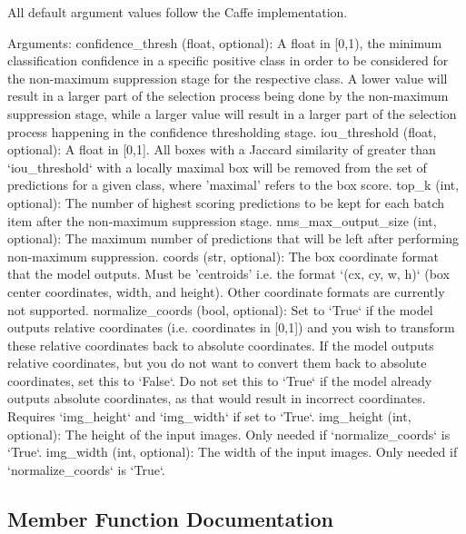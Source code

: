 \begin{DoxyVerb}All default argument values follow the Caffe implementation.

Arguments:
    confidence_thresh (float, optional): A float in [0,1), the minimum classification confidence in a specific
positive class in order to be considered for the non-maximum suppression stage for the respective class.
A lower value will result in a larger part of the selection process being done by the non-maximum suppression
stage, while a larger value will result in a larger part of the selection process happening in the confidence
thresholding stage.
    iou_threshold (float, optional): A float in [0,1]. All boxes with a Jaccard similarity of greater than `iou_threshold`
with a locally maximal box will be removed from the set of predictions for a given class, where 'maximal' refers
to the box score.
    top_k (int, optional): The number of highest scoring predictions to be kept for each batch item after the
non-maximum suppression stage.
    nms_max_output_size (int, optional): The maximum number of predictions that will be left after performing non-maximum
suppression.
    coords (str, optional): The box coordinate format that the model outputs. Must be 'centroids'
i.e. the format `(cx, cy, w, h)` (box center coordinates, width, and height). Other coordinate formats are
currently not supported.
    normalize_coords (bool, optional): Set to `True` if the model outputs relative coordinates (i.e. coordinates in [0,1])
and you wish to transform these relative coordinates back to absolute coordinates. If the model outputs
relative coordinates, but you do not want to convert them back to absolute coordinates, set this to `False`.
Do not set this to `True` if the model already outputs absolute coordinates, as that would result in incorrect
coordinates. Requires `img_height` and `img_width` if set to `True`.
    img_height (int, optional): The height of the input images. Only needed if `normalize_coords` is `True`.
    img_width (int, optional): The width of the input images. Only needed if `normalize_coords` is `True`.
\end{DoxyVerb}
 

\subsection{Member Function Documentation}
\mbox{\label{classkeras__utils_1_1keras__layer___decode_detections_1_1_decode_detections_aee76a1042409f7e2393853887d432690}} 
